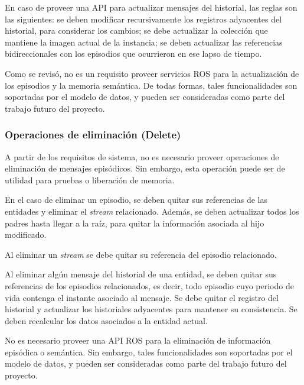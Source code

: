 En caso de proveer una API para actualizar mensajes del historial, las reglas son las siguientes: se deben modificar recursivamente los registros adyacentes del historial, para considerar los cambios; se debe actualizar la colección que mantiene la imagen actual de la instancia; se deben actualizar las referencias bidireccionales con los episodios que ocurrieron en ese lapso de tiempo.

Como se revisó, no es un requisito proveer servicios ROS para la actualización de los episodios y la memoria semántica. De todas formas, tales funcionalidades son soportadas por el modelo de datos, y pueden ser consideradas como parte del trabajo futuro del proyecto.


\subsubsection{Operaciones de eliminación (Delete)}

A partir de los requisitos de sistema, no es necesario proveer operaciones de eliminación de mensajes episódicos. Sin embargo, esta operación puede ser de utilidad para pruebas o liberación de memoria.

 En el caso de eliminar un episodio, se deben quitar sus referencias de las entidades y eliminar el \textit{stream} relacionado. Además, se deben actualizar todos los padres hasta llegar a la raíz, para quitar la información asociada al hijo modificado.

Al eliminar un \textit{stream} se debe quitar su referencia del episodio relacionado.

Al eliminar algún mensaje del historial de una entidad, se deben quitar sus referencias de los episodios relacionados, es decir, todo episodio cuyo periodo de vida contenga el instante asociado al mensaje. Se debe quitar el registro del historial y actualizar los historiales adyacentes para mantener su consistencia. Se deben recalcular los datos asociados a la entidad actual.

No es necesario proveer una API ROS para la eliminación de información episódica o semántica. Sin embargo, tales funcionalidades son soportadas por el modelo de datos, y pueden ser consideradas como parte del trabajo futuro del proyecto.


